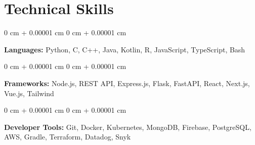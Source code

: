 \documentclass[10pt, letterpaper]{article}
\newenvironment{onecolentry}{
    \begin{adjustwidth}{
        0 cm + 0.00001 cm
    }{
        0 cm + 0.00001 cm
    }
}{
    \end{adjustwidth}
}
\begin{document}
    \vspace{0.10 cm}
    \section{Technical Skills}

    \begin{onecolentry}
        \textbf{Languages:} Python, C, C++, Java, Kotlin, R, JavaScript, TypeScript, Bash
    \end{onecolentry}

    \vspace{0.1 cm}

    \begin{onecolentry}
        \textbf{Frameworks:} Node.js, REST API, Express.js, Flask, FastAPI, React, Next.js, Vue.js, Tailwind
    \end{onecolentry}

    \vspace{0.1 cm}

    \begin{onecolentry}
        \textbf{Developer Tools:} Git, Docker, Kubernetes, MongoDB, Firebase, PostgreSQL, AWS, Gradle, Terraform, Datadog, Snyk
    \end{onecolentry}
\end{document}
